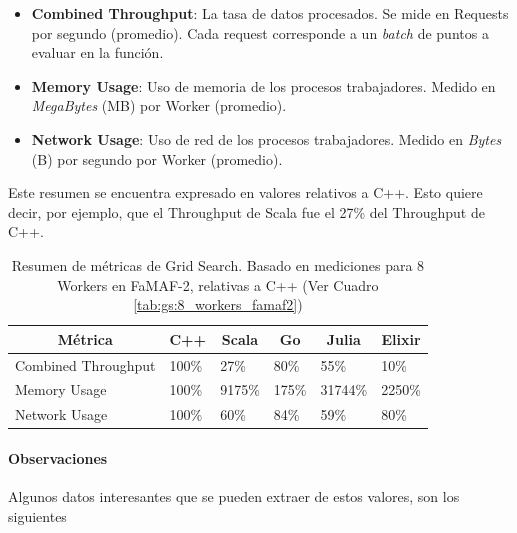 \documentclass[11pt]{article}
\begin{document}
\begin{itemize}
    \item \textbf{Combined Throughput}: La tasa de datos procesados. Se mide en Requests por segundo (promedio). Cada request corresponde a un \textit{batch} de puntos a evaluar en la función.
    \item \textbf{Memory Usage}: Uso de memoria de los procesos trabajadores. Medido en \textit{MegaBytes} (MB) por Worker (promedio).
    \item \textbf{Network Usage}: Uso de red de los procesos trabajadores. Medido en \textit{Bytes} (B) por segundo por Worker (promedio).
\end{itemize}

Este resumen se encuentra expresado en valores relativos a C++. Esto quiere decir, por ejemplo, que el Throughput de Scala fue el 27\% del Throughput de C++.

\begin{table}[h]
\centering
\begin{tabular}{|l|l|l|l|l|l|}
\hline
\multicolumn{1}{|c|}{Métrica} & \multicolumn{1}{c|}{C++} & \multicolumn{1}{c|}{Scala} & \multicolumn{1}{c|}{Go} & \multicolumn{1}{c|}{Julia} & \multicolumn{1}{c|}{Elixir} \\ \hline
Combined Throughput           & 100\%                    & 27\%                       & 80\%                    & 55\%                       & 10\%                        \\ \hline
Memory Usage                  & 100\%                    & 9175\%                     & 175\%                   & 31744\%                    & 2250\%                      \\ \hline
Network Usage                 & 100\%                    & 60\%                       & 84\%                    & 59\%                       & 80\%                        \\ \hline
\end{tabular}
\caption{Resumen de métricas de Grid Search. Basado en mediciones para 8 Workers en FaMAF-2, relativas a C++ (Ver Cuadro \ref{tab:gs:8_workers_famaf2})}
\label{tab:sis_dist:gs_metrics}
\end{table}

\paragraph{Observaciones}

Algunos datos interesantes que se pueden extraer de estos valores, son los siguientes
\end{document}
